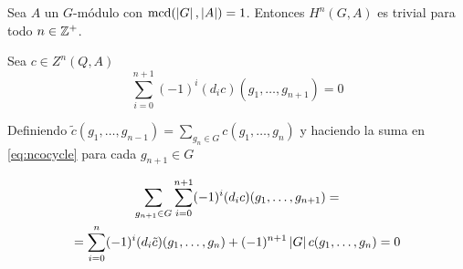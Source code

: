 \begin{teorema}\label{thm:trivialH}
	Sea $A$ un $G$-módulo con $\operatorname{mcd}(\left|G\right|, \left|A\right|) = 1$. Entonces $H^n(G,A)$ es trivial para todo $n\in\mathbb{Z}^+$.
	\begin{demostracion}
		Sea $c\in Z^n(Q,A)$
		\begin{equation}\label{eq:ncocycle}
			\sum\limits_{i=0}^{n+1} (-1)^i(d_ic)(g_1,\ldots,g_{n+1}) = 0
		\end{equation}
		
		Definiendo $\tilde c(g_1,\hdots,g_{n-1}) = {\displaystyle \sum_{g_n\in G} c(g_1,\hdots,g_{n})}$ y haciendo la suma en \eqref{eq:ncocycle} para cada $g_{n+1} \in G$
		

		\begin{multline*}
			\sum\limits_{g_{n+1}\in G}\sum\limits_{i=0}^{n+1} (-1)^i(d_ic)(g_1,\ldots,g_{n+1}) = \\ =			
			\sum\limits_{i=0}^{n} (-1)^i(d_i\tilde c)(g_1,\ldots,g_n) +
			(-1)^{n+1}\left|G\right| c(g_1,\ldots,g_n) = 0
		\end{multline*}
		

\end{demostracion}
\end{teorema}
